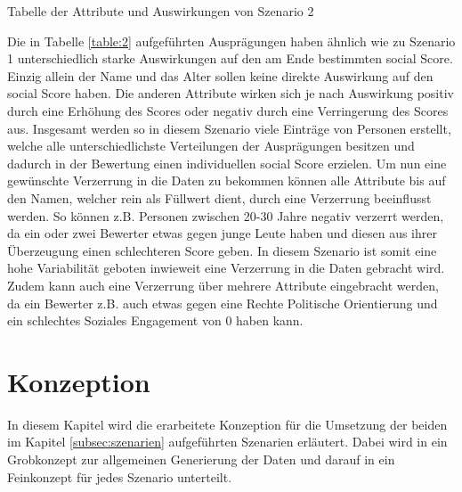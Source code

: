 \begin{onehalfspace}
\begin{table}[!h]
\caption{Tabelle der Attribute und Auswirkungen von Szenario 2}
\label{table:2}
\end{table}
Die in Tabelle \ref*{table:2} aufgeführten Ausprägungen haben ähnlich wie zu Szenario 1 unterschiedlich starke Auswirkungen auf den am Ende bestimmten social Score. Einzig allein der Name und das Alter sollen keine direkte Auswirkung auf den social Score haben. Die anderen Attribute wirken sich je nach Auswirkung positiv durch eine Erhöhung des Scores oder negativ durch eine Verringerung des Scores aus.
Insgesamt werden so in diesem Szenario viele Einträge von Personen erstellt, welche alle unterschiedlichste Verteilungen der Ausprägungen besitzen und dadurch in der Bewertung einen individuellen social Score erzielen. Um nun eine gewünschte Verzerrung in die Daten zu bekommen können alle Attribute bis auf den Namen, welcher rein als Füllwert dient, durch eine Verzerrung beeinflusst werden. So können z.B. Personen zwischen 20-30 Jahre negativ verzerrt werden, da ein oder zwei Bewerter etwas gegen junge Leute haben und diesen aus ihrer Überzeugung einen schlechteren Score geben. In diesem Szenario ist somit eine hohe Variabilität geboten inwieweit eine Verzerrung in die Daten gebracht wird. Zudem kann auch eine Verzerrung über mehrere Attribute eingebracht werden, da ein Bewerter z.B. auch etwas gegen eine Rechte Politische Orientierung und ein schlechtes Soziales Engagement von 0 haben kann. 
\section{Konzeption}
\label{subsection:konzeption}
In diesem Kapitel wird die erarbeitete Konzeption für die Umsetzung der beiden im Kapitel \ref*{subsec:szenarien} aufgeführten Szenarien erläutert. Dabei wird in ein Grobkonzept zur allgemeinen Generierung der Daten und darauf in ein Feinkonzept für jedes Szenario unterteilt.

\end{onehalfspace}
